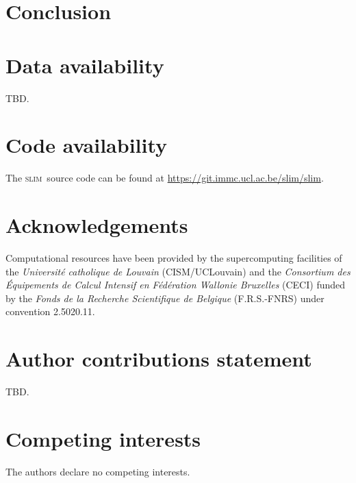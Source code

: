 \documentclass[preprint,12pt,authoryear]{elsarticle}
\newcommand{\slim}{\textsc{slim}\ }
\begin{document}
\section*{Conclusion}

\lipsum[1-1]


\section*{Data availability}

TBD.

\section*{Code availability}

The \slim source code can be found at \href{https://git.immc.ucl.ac.be/slim/slim}{https://git.immc.ucl.ac.be/slim/slim}.

\section*{Acknowledgements}

Computational resources have been provided by the supercomputing facilities of the \textit{Universit\'e catholique de Louvain} (CISM/UCLouvain) and the \textit{Consortium des \'Equipements de Calcul Intensif en F\'ed\'eration Wallonie Bruxelles} (CECI) funded by the \textit{Fonds de la Recherche Scientifique de Belgique} (F.R.S.-FNRS) under convention 2.5020.11.

\section*{Author contributions statement}

TBD.

\section*{Competing interests}

The authors declare no competing interests.




\end{document}
